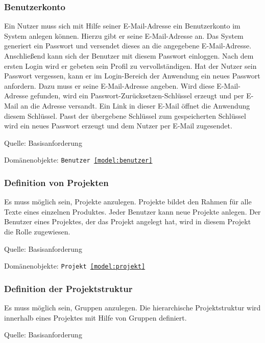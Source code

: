 \subsubsection{Benutzerkonto}\label{anforderung:registrierung}

Ein Nutzer muss sich mit Hilfe seiner E-Mail-Adresse ein Benutzerkonto im System anlegen können. Hierzu gibt er seine E-Mail-Adresse an. Das System generiert ein Passwort und versendet dieses an die angegebene E-Mail-Adresse. Anschließend kann sich der Benutzer mit diesem Passwort einloggen. Nach dem ersten Login wird er gebeten sein Profil zu vervollständigen. Hat der Nutzer sein Passwort vergessen, kann er im Login-Bereich der Anwendung ein neues Passwort anfordern. Dazu muss er seine E-Mail-Adresse angeben. Wird diese E-Mail-Adresse gefunden, wird ein Passwort-Zurücksetzen-Schlüssel erzeugt und per E-Mail an die Adresse versandt. Ein Link in dieser E-Mail öffnet die Anwendung diesem Schlüssel. Passt der übergebene Schlüssel zum gespeicherten Schlüssel wird ein neues Passwort erzeugt und dem Nutzer per E-Mail zugesendet.

\textsf{Quelle:} Basisanforderung

\textsf{Domänenobjekte:} \texttt{Benutzer \ref{model:benutzer}}

\subsubsection{Definition von Projekten}\label{anforderung:definition-projekt}

Es muss möglich sein, Projekte anzulegen. Projekte bildet den Rahmen für alle Texte eines einzelnen Produktes. Jeder Benutzer kann neue Projekte anlegen. Der Benutzer eines Projektes, der das Projekt angelegt hat, wird in diesem Projekt die Rolle  zugewiesen.

\textsf{Quelle:} Basisanforderung

\textsf{Domänenobjekte:} \texttt{Projekt \ref{model:projekt}}

\subsubsection{Definition der Projektstruktur}\label{anforderung:definition-projektstruktur}

Es muss möglich sein, Gruppen anzulegen. Die hierarchische Projektstruktur wird innerhalb eines Projektes mit Hilfe von Gruppen definiert.

\textsf{Quelle:} Basisanforderung

